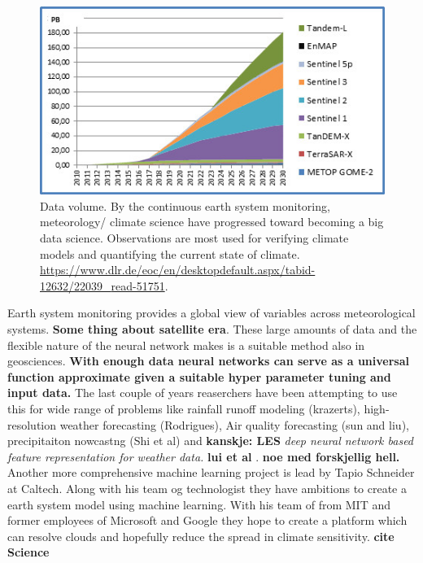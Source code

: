 \begin{figure}[h]
    \centering
    \includegraphics{Chapter1_Intro/images/Datenvolumen_D-SDA.jpg}
    \caption{Data volume. By the continuous earth system monitoring, meteorology/ climate science have progressed toward becoming a big data science. Observations are most used for verifying climate models and quantifying the current state of climate. \href{https://www.dlr.de/eoc/en/desktopdefault.aspx/tabid-12632/22039_read-51751}{https://www.dlr.de/eoc/en/desktopdefault.aspx/tabid-12632/22039{\_}read-51751}.}
    \label{fig:data_volum_sat}
\end{figure}
Earth system monitoring provides a global view of variables across meteorological systems. \textbf{Some thing about satellite era}. These large amounts of data and the flexible nature of the neural network makes is a suitable method also in geosciences. \textbf{With enough data neural networks can serve as a universal function approximate given a suitable hyper parameter tuning and input data.} The last couple of years reaserchers have been attempting to use this for wide range of problems like rainfall runoff modeling (krazerts), high-resolution weather forecasting (Rodrigues), Air quality forecasting (sun and liu), precipitaiton nowcastng (Shi et al) and \textbf{kanskje: LES} \textit{deep neural network based feature representation for weather data.} \textbf{lui et al }. \textbf{noe med forskjellig hell.} Another more comprehensive machine learning project is lead by Tapio Schneider at Caltech. Along with his team og technologist they have ambitions to create a earth system model using machine learning. With his team of from MIT and former employees of Microsoft and Google they hope to create a platform which can resolve clouds and hopefully reduce the spread in climate sensitivity. \textbf{cite Science}